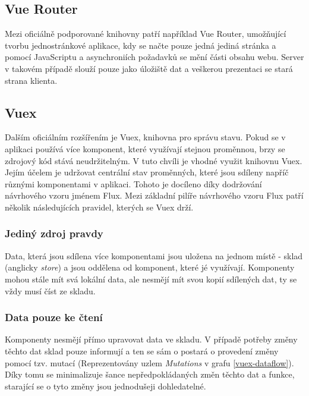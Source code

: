 \subsection{Vue Router}
Mezi oficiálně podporované knihovny patří například Vue Router, umožňující tvorbu jednostránkové aplikace, kdy se načte pouze jedná jediná stránka a pomocí JavaScriptu a asynchroniích požadavků se mění části obsahu webu. Server v takovém případě slouží pouze jako úložiště dat a veškerou prezentaci se stará strana klienta. %

\subsection{Vuex}
Dalším oficiálním rozšířením je Vuex, knihovna pro správu stavu. Pokud se v aplikaci používá více komponent, které využívají stejnou proměnnou, brzy se zdrojový kód stává neudržitelným. 
V tuto chvíli je vhodné využit knihovnu Vuex. Jejím účelem je udržovat centrální stav proměnných, které jsou sdíleny napříč různými komponentami v aplikaci. Tohoto je docíleno díky dodržování návrhového vzoru jménem Flux. Mezi základní pilíře návrhového vzoru Flux patří několik následujících pravidel, kterých se Vuex drží. 


\subsubsection*{Jediný zdroj pravdy}
Data, která jsou sdílena více komponentami jsou uložena na jednom místě - sklad (anglicky \emph{store}) a jsou oddělena od komponent, které jé využívají. Komponenty mohou stále mít svá lokální data, ale nesmějí mít svou kopií sdílených dat, ty se vždy musí číst ze skladu.

\subsubsection*{Data pouze ke čtení}
Komponenty nesmějí přímo upravovat data ve skladu. V případě potřeby změny těchto dat sklad pouze informují a ten se sám o postará o provedení změny pomocí tzv. mutací (Reprezentovány uzlem \emph{Mutations} v grafu \ref{vuex-dataflow}). Díky tomu se minimalizuje šance nepředpokládaných změn těchto dat a funkce, starající se o tyto změny jsou jednodušeji dohledatelné.

